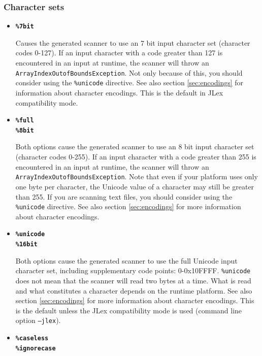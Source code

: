 \documentclass[11pt]{scrartcl}
\begin{document}
\subsubsection{Character sets}\label{CharacterSets}
\begin{itemize}
\item
{\bfseries \texttt{\%7bit}}

Causes the generated scanner to use an 7 bit input character set (character
codes 0-127). If an input character with a code greater than 127 is
encountered in an input at runtime, the scanner will throw an \texttt{ArrayIndexOutofBoundsException}.
Not only because of this, you should consider using the \texttt{\%unicode} directive. 
See also section \ref{sec:encodings} for information about character encodings. This is the default in JLex compatibility mode.
 
\item
{\bfseries \texttt{\%full}}\\
{\bfseries \texttt{\%8bit}}

Both options cause the generated scanner to use an 8 bit input character
set (character codes 0-255). If an input character with a code greater
than 255 is encountered in an input at runtime, the scanner will throw
an \texttt{ArrayIndexOutofBoundsException}. Note that even if your platform
uses only one byte per character, the Unicode value of a character may
still be greater than 255. If you are scanning text files, you should
consider using the \texttt{\%unicode} directive. See also section \ref{sec:encodings}
for more information about character encodings.
 
\item
{\bfseries \texttt{\%unicode}}\\
{\bfseries \texttt{\%16bit}}

Both options cause the generated scanner to use the full Unicode input
character set, including supplementary code points: 0-0x10FFFF. \texttt{\%unicode}
does not mean that the scanner will read two bytes at a time. What is read
and what constitutes a character depends on the runtime platform. See also
section \ref{sec:encodings} for more information about character encodings.
This is the default unless the JLex compatibility mode is used (command line
option \texttt{--jlex}).

\label{caseless} \item {\bfseries \texttt{\%caseless}}\\ {\bfseries \texttt{\%ignorecase}}


\end{itemize}
\end{document}
